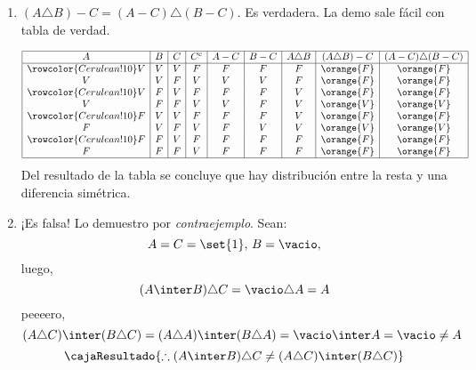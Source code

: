 \begin{enumerate}[label=\roman*)]
  \item $(A \triangle B) - C = (A-C) \triangle (B - C)$. Es verdadera.
        La demo sale fácil con tabla de verdad.

        $$
          \begin{array}{|c|c|c|c|c|c|c|c|c|}
            \hline
            A & B & C & C^c & A - C & B - C & A \triangle B & (A \triangle B) - C & (A - C) \triangle (B - C) \\\hline \rowcolor{Cerulean!10}
            V & V & V & F   & F     & F     & F             & \orange{F}          & \orange{F}                \\
            V & V & F & V   & V     & V     & F             & \orange{F}          & \orange{F}                \\\rowcolor{Cerulean!10}
            V & F & V & F   & F     & F     & V             & \orange{F}          & \orange{F}                \\
            V & F & F & V   & V     & F     & V             & \orange{V}          & \orange{V}                \\\rowcolor{Cerulean!10}
            F & V & V & F   & F     & F     & V             & \orange{F}          & \orange{F}                \\
            F & V & F & V   & F     & V     & V             & \orange{V}          & \orange{V}                \\\rowcolor{Cerulean!10}
            F & F & V & F   & F     & F     & F             & \orange{F}          & \orange{F}                \\
            F & F & F & V   & F     & F     & F             & \orange{F}          & \orange{F}                \\ \hline
          \end{array}
        $$
        Del resultado de la tabla se concluye que hay distribución entre la resta y una diferencia simétrica.

  \item ¡Es falsa!
        Lo demuestro por \textit{contraejemplo}.
        Sean:
        $$
          A = C = \set{1},\, B = \vacio,
        $$
        luego,
        $$
          (A \inter B) \triangle C = \vacio \triangle A = A
        $$
        peeeero,
        $$
          (A \triangle C) \inter (B \triangle C) =
          (A \triangle A) \inter (B \triangle A) =
          \vacio \inter A = \vacio \neq A
        $$
        $$
          \cajaResultado{
            \therefore (A \inter B) \triangle C \neq (A \triangle C) \inter (B \triangle C)
          }
        $$


\end{enumerate}
